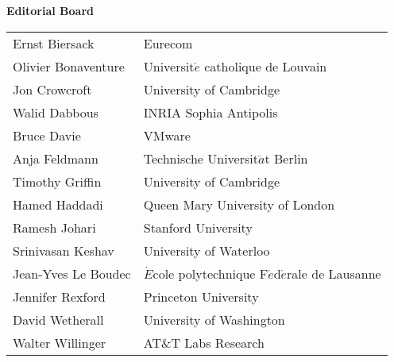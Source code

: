
%





\begin{center}
{\Huge \textbf{Editorial Board}}


\Large 
\vspace{1in}
\begin{tabular}{ll}
Ernst Biersack &	Eurecom \\
Olivier Bonaventure &	Universit$\acute{e}$ catholique de Louvain \\
Jon Crowcroft	&  University of Cambridge \\
Walid Dabbous	  & INRIA Sophia Antipolis \\
Bruce Davie	& VMware \\
Anja Feldmann	& Technische Universit$\ddot{a}$t Berlin\\
Timothy Griffin	& University of Cambridge \\
Hamed Haddadi &	Queen Mary University of London\\
Ramesh Johari	 & Stanford University\\
Srinivasan Keshav &	University of Waterloo\\
Jean-Yves Le Boudec	& $\acute{E}$cole polytechnique F$\acute{e}$d$\acute{e}$rale de Lausanne\\
Jennifer Rexford &	Princeton University\\
David Wetherall	& University of Washington\\
Walter Willinger	& AT\&T Labs Research\\
\end{tabular}
\end{center}


\newpage



